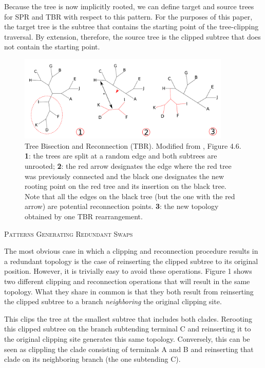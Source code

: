 \documentclass[12pt,letterpaper]{article}
\renewcommand{\section}[1]{%
\bigskip
\begin{center}
\begin{Large}
\normalfont\scshape #1
\medskip
\end{Large}
\end{center}}
\begin{document}
Because the tree is now implicitly rooted, we can define target and source trees for SPR and TBR with respect to this pattern.
For the purposes of this paper, the target tree is the subtree that contains the starting point of the tree-clipping traversal.
By extension, therefore, the source tree is the clipped subtree that does not contain the starting point.

\begin{figure}[!htbp]
\centering
   \includegraphics[width=0.9\textwidth]{Figure/TBR.pdf}
\caption{Tree Bisection and Reconnection (TBR). Modified from \cite{felsenstein2004inferring}, Figure 4.6. \textbf{1}: the trees are split at a random edge and both subtrees are unrooted; \textbf{2}: the red arrow designates the edge where the red tree was previously connected and the black one designates the new rooting point on the red tree and its insertion on the black tree. Note that all the edges on the black tree (but the one with the red arrow) are potential reconnection points. \textbf{3}: the new topology obtained by one TBR rearrangement.}
\label{Figure_TBR}
\end{figure}

\section{Patterns Generating Redundant Swaps}
The most obvious case in which a clipping and reconnection procedure results in a redundant topology is the case of reinserting the clipped subtree to its original position.
However, it is trivially easy to avoid these operations.
Figure 1 shows two different clipping and reconnection operations that will result in the same topology. 
What they share in common is that they both result from reinserting the clipped subtree to a branch \textit{neighboring} the original clipping site.

This clips the tree at the smallest subtree that includes both clades. %
Rerooting this clipped subtree on the branch subtending terminal C and reinserting it to the original clipping site generates this same topology.
Conversely, this can be seen as clippling the clade consisting of terminals A and B and reinserting that clade on its neighboring branch (the one subtending C).
\end{document}
